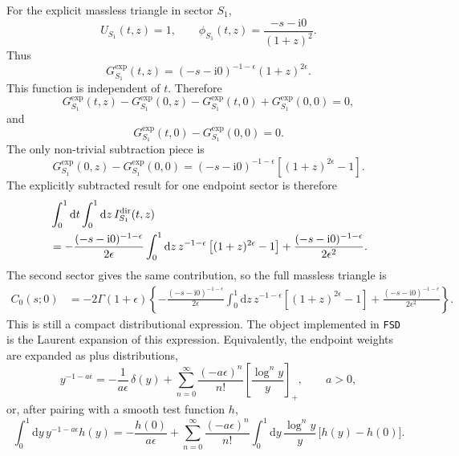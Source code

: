 \documentclass[11pt]{article}
\newcommand{\dd}{\mathrm d}
\newcommand{\ii}{\mathrm i}
\newcommand{\eps}{\epsilon}
\begin{document}
For the explicit massless triangle in sector \(S_1\),
\begin{equation}
  U_{S_1}(t,z)=1,
  \qquad
  \phi_{S_1}(t,z)=\frac{-s-\ii0}{(1+z)^2}.
\end{equation}
Thus
\begin{equation}
  G_{S_1}^{\mathrm{exp}}(t,z)
  =
  (-s-\ii0)^{-1-\eps}(1+z)^{2\eps}.
\end{equation}
This function is independent of \(t\).  Therefore
\begin{equation}
  G_{S_1}^{\mathrm{exp}}(t,z)
  -
  G_{S_1}^{\mathrm{exp}}(0,z)
  -
  G_{S_1}^{\mathrm{exp}}(t,0)
  +
  G_{S_1}^{\mathrm{exp}}(0,0)
  =
  0,
\end{equation}
and
\begin{equation}
  G_{S_1}^{\mathrm{exp}}(t,0)
  -
  G_{S_1}^{\mathrm{exp}}(0,0)
  =
  0.
\end{equation}
The only non-trivial subtraction piece is
\begin{equation}
  G_{S_1}^{\mathrm{exp}}(0,z)
  -
  G_{S_1}^{\mathrm{exp}}(0,0)
  =
  (-s-\ii0)^{-1-\eps}
  \left[
    (1+z)^{2\eps}-1
  \right].
\end{equation}
The explicitly subtracted result for one endpoint sector is therefore
\begin{align}
  &\int_0^1 \dd t\int_0^1 \dd z\,
  I_{S_1}^{\mathrm{dir}}(t,z)
  \notag\\
  &=
  -\frac{(-s-\ii0)^{-1-\eps}}{2\eps}
  \int_0^1 \dd z\,
  z^{-1-\eps}
  \left[
    (1+z)^{2\eps}-1
  \right]
  +
  \frac{(-s-\ii0)^{-1-\eps}}{2\eps^2}.
\end{align}
The second sector gives the same contribution, so the full massless triangle is
\begin{align}
  C_0(s;0)
  &=
  -2\Gamma(1+\eps)
  \left\{
  -\frac{(-s-\ii0)^{-1-\eps}}{2\eps}
  \int_0^1 \dd z\,
  z^{-1-\eps}
  \left[
    (1+z)^{2\eps}-1
  \right]
  +
  \frac{(-s-\ii0)^{-1-\eps}}{2\eps^2}
  \right\}.
\end{align}
This is still a compact distributional expression.  The object implemented in
\texttt{FSD} is the Laurent expansion of this expression.  Equivalently, the
endpoint weights are expanded as plus distributions,
\begin{equation}
  y^{-1-a\eps}
  =
  -\frac{1}{a\eps}\,\delta(y)
  +
  \sum_{n=0}^{\infty}
  \frac{(-a\eps)^n}{n!}
  \left[\frac{\log^n y}{y}\right]_+ ,
  \qquad a>0 ,
\end{equation}
or, after pairing with a smooth test function \(h\),
\begin{equation}
  \int_0^1\dd y\,y^{-1-a\eps}h(y)
  =
  -\frac{h(0)}{a\eps}
  +
  \sum_{n=0}^{\infty}
  \frac{(-a\eps)^n}{n!}
  \int_0^1\dd y\,
  \frac{\log^n y}{y}\,
  \bigl[h(y)-h(0)\bigr].
\end{equation}
\end{document}
